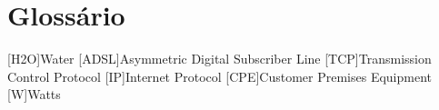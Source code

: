 \chapter{Glossário}

\footnotesize
\SingleSpacing

\begin{multicols}{2}
\begin{acronym}[AAAAAA]

	[H2O]{Water}
	[ADSL]{Asymmetric Digital Subscriber Line}
	[TCP]{Transmission Control Protocol}
	[IP]{Internet Protocol}
	[CPE]{Customer Premises Equipment}
	{Watts}

\end{acronym}
\end{multicols}

